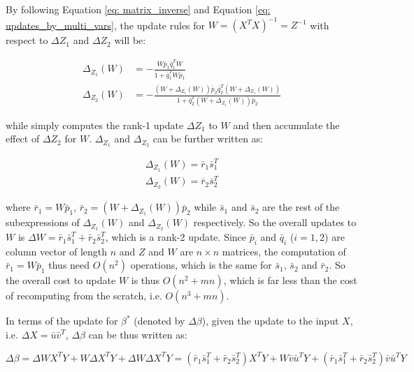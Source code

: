 By following Equation \ref{eq: matrix_inverse} and Equation \ref{eq: updates_by_multi_vars}, the update rules for $W = (X^TX)^{-1} = Z^{-1}$ with respect to $\Delta Z_1$ and $\Delta Z_2$ will be:

\begin{center}
\begin{equation}
\begin{split}
    \Delta_{Z_1}(W)& = -\frac{W\bar{p}_1\bar{q}_1^TW}{1 + \bar{q}_1^TW\bar{p}_1}\\
    \Delta_{Z_2}(W)& = -\frac{(W+\Delta_{Z_1}(W))\bar{p}_2\bar{q}_2^T(W+\Delta_{Z_1}(W))}{1 + \bar{q}_2^T(W+\Delta_{Z_1}(W))\bar{p}_2}
\end{split}   
\end{equation}
\end{center}

while simply computes the rank-1 update $\Delta Z_1$ to $W$ and then accumulate the effect of $\Delta Z_2$ for $W$. $\Delta_{Z_1}$ and $\Delta_{Z_2}$ can be further written as:

\begin{equation}
\begin{split}
\Delta_{Z_1}(W) = \bar{r}_1\bar{s}_1^T\\    
\Delta_{Z_2}(W) = \bar{r}_2\bar{s}_2^T
\end{split}
\end{equation}

where $\bar{r}_1 = W\bar{p}_1$, $\bar{r}_2 = (W+\Delta_{Z_1}(W))\bar{p}_2$ while $\bar{s}_1$ and $\bar{s}_2$ are the rest of the subexpressions of $\Delta_{Z_1}(W)$ and $\Delta_{Z_2}(W)$ respectively. So the overall updates to $W$ is $\Delta W = \bar{r}_1\bar{s}_1^T + \bar{r}_2\bar{s}_2^T$, which is a rank-2 update.
Since $\bar{p}_i$ and $\bar{q}_i$ ($i=1,2$) are column vector of length $n$ and $Z$ and $W$ are $n \times n$ matrices, the computation of $\bar{r}_1 = W\bar{p}_1$ thus need $O(n^2)$ operations, which is the same for $\bar{s}_1$, $\bar{s}_2$ and $\bar{r}_2$. So the overall cost to update $W$ is thus $O(n^2 + mn)$, which is far less than the cost of recomputing from the scratch, i.e. $O(n^3 + mn)$.

In terms of the update for $\beta^*$ (denoted by $\Delta \beta$), given the update to the input $X$, i.e. $\Delta X=\bar{u}\bar{v}^T$, $\Delta \beta$ can be thus written as:

\begin{equation}
    \Delta \beta = \Delta WX^TY + W\Delta X^TY + \Delta W\Delta X^TY = (\bar{r}_1\bar{s}_1^T + \bar{r}_2\bar{s}_2^T)X^TY + W\bar{v}\bar{u}^TY + (\bar{r}_1\bar{s}_1^T + \bar{r}_2\bar{s}_2^T)\bar{v}\bar{u}^TY
\end{equation}


